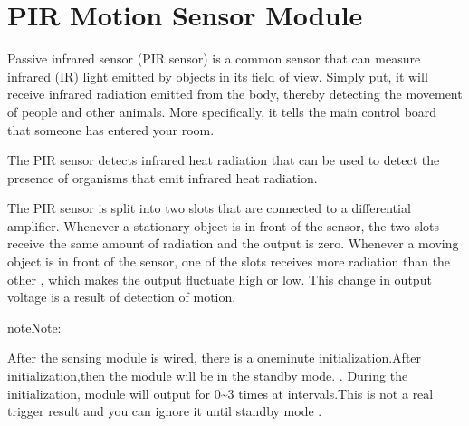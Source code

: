 \documentclass[a4paper,11pt,english]{sphinxmanual}
\let\sphinxpxdimen\pdfpxdimen\else\newdimen\sphinxpxdimen
\begin{document}
\sphinxstepscope


\section{PIR Motion Sensor Module}
\label{\detokenize{Components_Kit/component_pir:pir-motion-sensor-module}}\label{\detokenize{Components_Kit/component_pir:cpn-pir}}\label{\detokenize{Components_Kit/component_pir::doc}}
\sphinxAtStartPar
Passive infrared sensor (PIR sensor) is a common sensor that can measure infrared (IR) light emitted by objects in its field of view. Simply put, it will receive infrared radiation emitted from the body, thereby detecting the movement of people and other animals. More specifically, it tells the main control board that someone has entered your room.

\noindent{\hspace*{\fill}\sphinxincludegraphics[width=500\sphinxpxdimen]{{PIR1}.png}\hspace*{\fill}}

\sphinxAtStartPar
The PIR sensor detects infrared heat radiation that can be used to detect the presence of organisms that emit infrared heat radiation.

\sphinxAtStartPar
The PIR sensor is split into two slots that are connected to a differential amplifier. Whenever a stationary object is in front of the sensor, the two slots receive the same amount of radiation and the output is zero. Whenever a moving object is in front of the sensor, one of the slots receives more radiation than the other , which makes the output fluctuate high or low. This change in output voltage is a result of detection of motion.

\noindent\sphinxincludegraphics[width=800\sphinxpxdimen]{{PIR2}.png}

\begin{sphinxadmonition}{note}{Note:}
\sphinxAtStartPar
{}

\sphinxAtStartPar
After the sensing module is wired, there is a one\sphinxhyphen{}minute initialization.After initialization,then the module will be in the standby mode.
.
During the initialization, module will output for 0\textasciitilde{}3 times at intervals.This is not a real trigger result and you can ignore it until standby mode .
\end{sphinxadmonition}
\end{document}
